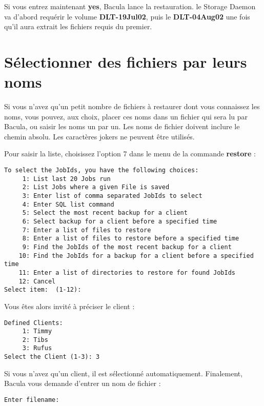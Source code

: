 Si vous entrez maintenant {\bf yes}, Bacula lance la restauration. le Storage 
Daemon va d'abord requ\'erir le volume {\bf DLT-19Jul02}, puis le {\bf DLT-04Aug02} 
une fois qu'il aura extrait les fichiers requis du premier.

\section{S\'electionner des fichiers par leurs noms}

Si vous n'avez qu'un petit nombre de fichiers \`a restaurer dont vous connaissez 
les noms, vous pouvez, aux choix, placer ces noms dans un fichier qui sera 
lu par Bacula, ou saisir les noms un par un. Les noms de fichier doivent inclure 
le chemin absolu. Les caract\`eres jokers ne peuvent \^etre utilis\'es.

Pour saisir la liste, choisissez l'option 7 dans le menu de la commande {\bf restore} :

\footnotesize
\begin{verbatim}
To select the JobIds, you have the following choices:
     1: List last 20 Jobs run
     2: List Jobs where a given File is saved
     3: Enter list of comma separated JobIds to select
     4: Enter SQL list command
     5: Select the most recent backup for a client
     6: Select backup for a client before a specified time
     7: Enter a list of files to restore
     8: Enter a list of files to restore before a specified time
     9: Find the JobIds of the most recent backup for a client
    10: Find the JobIds for a backup for a client before a specified time
    11: Enter a list of directories to restore for found JobIds
    12: Cancel
Select item:  (1-12):
\end{verbatim}
\normalsize

Vous \^etes alors invit\'e \`a pr\'eciser le client :

\footnotesize
\begin{verbatim}
Defined Clients:
     1: Timmy
     2: Tibs
     3: Rufus
Select the Client (1-3): 3
\end{verbatim}
\normalsize

Si vous n'avez qu'un client, il est s\'electionn\'e automatiquement.
Finalement, Bacula vous demande d'entrer un nom de fichier :

\footnotesize
\begin{verbatim}
Enter filename:
\end{verbatim}
\normalsize

